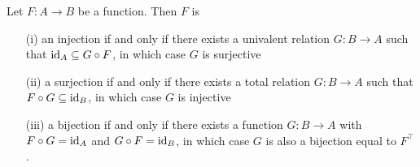 \begin{theorem}
	Let $F : A \to B$ be a function. Then $F$ is
	\\
	\begin{itemize}
		\item[(i)] an injection if and only if there exists a univalent relation $G : B \to A$ such that $\operatorname{\mathrm{id}}_{A} \subseteq G \circ F$, in which case $G$ is surjective
		\\

		\item[(ii)] a surjection if and only if there exists a total relation $G : B \to A$ such that $F \circ G \subseteq \operatorname{\mathrm{id}}_{B}$, in which case $G$ is injective
		\\

		\item[(iii)] a bijection if and only if there exists a function $G : B \to A$ with $F \circ G = \operatorname{\mathrm{id}}_{A}$ and $G \circ F = \operatorname{\mathrm{id}}_{B}$, in which case $G$ is also a bijection equal to $F^{\top}$. 
		\\
	\end{itemize}
\end{theorem}

